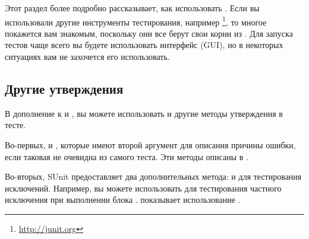\documentclass[a4paper,10pt,twoside]{book}
\begin{document}
Этот раздел более подробно рассказывает, как использовать \SUnit.
Если вы использовали другие инструменты тестирования, например \JUnit\footnote{\url{http://junit.org}},
то многое покажется вам знакомым, поскольку они все берут свои корни из \SUnit.
Для запуска тестов чаще всего вы будете использовать \SUnit интерфейс (GUI),
но в некоторых ситуациях вам не захочется его использовать.

\subsection{Другие утверждения}

В дополнение к  и , вы можете использовать и другие методы утверждения в тесте.

Во-первых,  и ,
которые имеют второй аргумент для описания причины ошибки,
если таковая не очевидна из самого теста. Эти методы описаны в .

Во-вторых, SUnit предоставляет два дополнительных метода:  и
 для тестирования исключений.
Например, вы можете использовать 
для тестирования частного исключения при выполнении блока .
 показывает использование \mbox{.}
\end{document}
